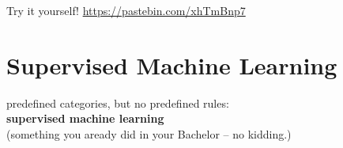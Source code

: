 \documentclass{beamer}
\begin{document}
\begin{frame}{Try it yourself!}
	\huge
	\url{https://pastebin.com/xhTmBnp7}
\end{frame}




\section[Supervised Machine Learning]{Supervised Machine Learning}

\begin{frame}[plain]
	predefined categories, but no predefined rules:\\ \textbf{supervised machine learning}\\
	\vspace{1cm}\hspace{1cm} \onslide<2> \footnotesize{(something you aready did in your Bachelor -- no kidding.)}
\end{frame}
\end{document}
